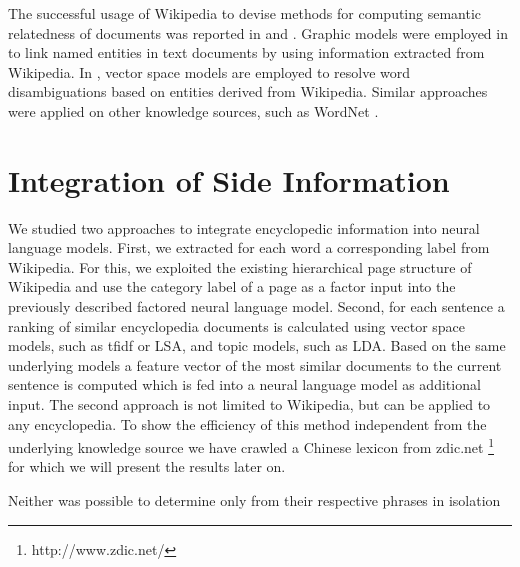 \documentclass[a4paper]{article}
\begin{document}
The successful usage of Wikipedia to devise methods for computing semantic relatedness of documents was reported in \cite{gabrilovich2007computing} and \cite{strube2006wikirelate}.
Graphic models were employed in \cite{han2012entity} to link named entities in text documents by using information extracted from Wikipedia. 
In \cite{cucerzan2007large},\cite{bunescu2006using} vector space models are employed to resolve word disambiguations based on entities derived from Wikipedia.
Similar approaches were applied on other knowledge sources, such as WordNet \cite{hearst1992automatic}.
 

\section{Integration of Side Information}
We studied two approaches to integrate encyclopedic information into neural language models.
First, we extracted for each word a corresponding label from Wikipedia. For this, we exploited the existing hierarchical page structure of Wikipedia and use the category label of a page as a factor input into the previously described factored neural language model.
Second, for each sentence a ranking of similar encyclopedia documents is calculated using vector space models, such as tfidf or LSA, and topic models, such as LDA. Based on the same underlying models a feature vector of the most similar documents to the current sentence is computed which is fed into a neural language model as additional input. The second approach is not limited to Wikipedia, but can be applied to any encyclopedia. To show the efficiency of this method independent from the underlying knowledge source we have crawled a Chinese lexicon from zdic.net \footnote{http://www.zdic.net/} for which we will present the results later on. 

Neither was
possible to determine only from their respective phrases in isolation
\end{document}

